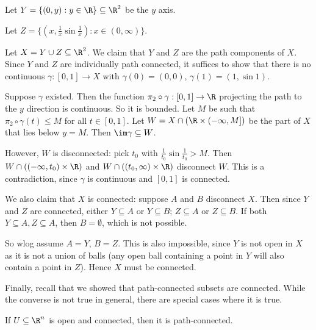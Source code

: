 \documentclass[a4paper]{article}
\begin{document}
\begin{eg}
  Let $Y = \{(0, y): y\in \R\}\subseteq \R^2$ be the $y$ axis.

  Let $Z = \{(x, \frac{1}{x}\sin \frac{1}{x}): x\in (0, \infty)\}$.
  \begin{center}
  \end{center}
  Let $X = Y\cup Z\subseteq \R^2$. We claim that $Y$ and $Z$ are the path components of $X$. Since $Y$ and $Z$ are individually path connected, it suffices to show that there is no continuous $\gamma: [0, 1]\to X$ with $\gamma(0) = (0, 0)$, $\gamma(1) = (1,\sin 1)$.

  Suppose $\gamma$ existed. Then the function $\pi_2\circ \gamma: [0, 1] \to \R$ projecting the path to the $y$ direction is continuous. So it is bounded. Let $M$ be such that $\pi_2\circ \gamma (t) \leq M$ for all $t\in [0, 1]$. Let $W = X\cap (\R \times (-\infty, M])$ be the part of $X$ that lies below $y = M$. Then $\im \gamma \subseteq W$.

  However, $W$ is disconnected: pick $t_0$ with $\frac{1}{t_0} \sin\frac{1}{t_0} > M$. Then $W \cap ((-\infty, t_0)\times \R)$ and $W\cap ((t_0, \infty)\times \R)$ disconnect $W$. This is a contradiction, since $\gamma$ is continuous and $[0, 1]$ is connected.

  We also claim that $X$ is connected: suppose $A$ and $B$ disconnect $X$. Then since $Y$ and $Z$ are connected, either $Y\subseteq A$ or $Y\subseteq B$; $Z\subseteq A$ or $Z\subseteq B$. If both $Y\subseteq A, Z\subseteq A$, then $B=\emptyset$, which is not possible.

  So wlog assume $A = Y$, $B = Z$. This is also impossible, since $Y$ is not open in $X$ as it is not a union of balls (any open ball containing a point in $Y$ will also contain a point in $Z$). Hence $X$ must be connected.
\end{eg}

Finally, recall that we showed that path-connected subsets are connected. While the converse is not true in general, there are special cases where it is true.
\begin{prop}
  If $U\subseteq \R^n$ is open and connected, then it is path-connected.
\end{prop}
\end{document}
